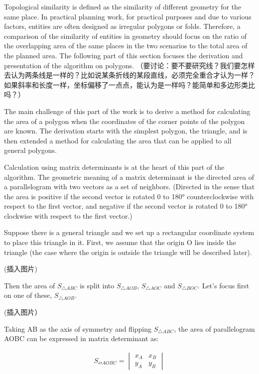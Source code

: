 Topological similarity is defined as the similarity of different geometry for the same place. In practical planning work, for practical purposes and due to various factors, entities are often designed as irregular polygons or folds. Therefore, a comparison of the similarity of entities in geometry should focus on the ratio of the overlapping area of the same places in the two scenarios to the total area of the planned area. The following part of this section focuses the derivation and presentation of the algorithm on polygons.
（要讨论：要不要研究线？我们要怎样去认为两条线是一样的？比如说某条折线的某段直线，必须完全重合才认为一样？如果斜率和长度一样，坐标偏移了一点点，能认为是一样吗？能简单和多边形类比吗？）

The main challenge of this part of the work is to derive a method for calculating the area of a polygon when the coordinates of the corner points of the polygon are known. The derivation starts with the simplest polygon, the triangle, and is then extended a method for calculating the area that can be applied to all general polygons.

Calculation using matrix determinants is at the heart of this part of the algorithm. The geometric meaning of a matrix determinant is the directed area of a parallelogram with two vectors as a set of neighbors. (Directed in the sense that the area is positive if the second vector is rotated 0 to 180° counterclockwise with respect to the first vector, and negative if the second vector is rotated 0 to 180° clockwise with respect to the first vector.)

Suppose there is a general triangle and we set up a rectangular coordinate system to place this triangle in it. First, we assume that the origin O lies inside the triangle (the case where the origin is outside the triangle will be described later).

(插入图片)

Then the area of $S_{\triangle ABC}$ is split into $S_{\triangle AOB}$, $S_{\triangle AOC}$ and $S_{\triangle BOC}$. Let’s focus first on one of these, $S_{\triangle AOB}$.

(插入图片）

Taking AB as the axis of symmetry and flipping $S_{\triangle ABC}$, the area of parallelogram AOBC can be expressed in matrix determinant as:

\begin{equation}
\begin{split}
S_{\parallelogram AOBC}=\begin{vmatrix}
  x_{A} &x_{B}  \\
  y_{A} &y_{B} 
\end{vmatrix}
\end{split}
\end{equation}

